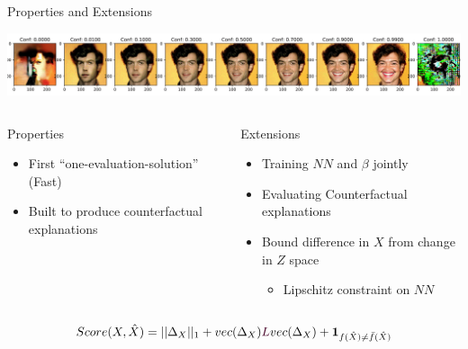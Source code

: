 \begin{frame}{Properties and Extensions}
	\begin{center}
	    \includegraphics[width=\textwidth]{interpolation.png}
	\end{center}

	\begin{columns}
		\begin{column}{0.5\textwidth}
			\alert{Properties}
			\begin{itemize}
				\item \alert{First} ``one-evaluation-solution'' (Fast)
				\item Built to produce counterfactual explanations
			\end{itemize}
		\end{column}
		\begin{column}{0.5\textwidth}
			\alert{Extensions}
			\begin{itemize}
				\item Training $NN$ and $\beta$ jointly
				\item Evaluating Counterfactual explanations
				\item Bound difference in $X$ from change in $Z$ space
					\begin{itemize}
						\item Lipschitz constraint on $NN$
					\end{itemize}
			\end{itemize}
		\end{column}

	\end{columns}
	\vspace{1em}
	$$
		Score(X, \hat X) = ||\Delta_X||_1 + vec(\Delta_X)\rL vec(\Delta_X) + \boldsymbol{1}_{f(\hat X) \neq \bar f(\hat X)}
	$$
\end{frame}

